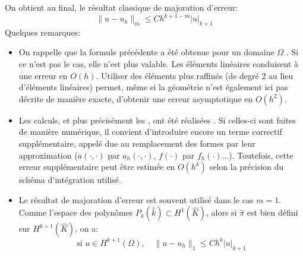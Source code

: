 On obtient au final, le résultat classique de majoration d'erreur:
\begin{equation}
\|u-u_h\|_m\le C h^{k+1-m} |u|_{k+1}
\end{equation}
Quelques remarques:
\begin{itemize}
  \item On rappelle que la formule précédente a été obtenue pour un domaine $\Omega$  . Si ce n'est pas le cas, elle n'est plus valable.
	Les éléments linéaires conduisent à une erreur en $O(h)$.
	Utiliser des éléments plus raffinés (de degré 2 au lieu d'éléments linéaires) permet, 	même si la géométrie n'est également ici pas décrite de manière exacte, d'obtenir une 	erreur asymptotique en $O(h^2)$.
  \item Les calculs, et plus précisément les , ont été réalisées .
	Si celles-ci sont faites de manière numérique, il convient d'introduire encore un 	terme correctif supplémentaire, appelé  due au remplacement des formes par leur approximation ($a(\cdot,\cdot)$ par $a_h(\cdot,\cdot)$, $f(\cdot)$ par $f_h(\cdot)$...). Toutefois, cette erreur supplémentaire peut être estimée en $O(h^k)$ selon la précision du schéma d'intégration utilisé.
  \item Le résultat de majoration d'erreur est souvent utilisé dans le cas $m=1$.
	Comme l'espace des polynômes $P_k(\hat{k})\subset H^1(\hat{K})$, alors si $\hat{\pi}$ est bien défini sur $H^{k+1}(\hat{K})$, on a:
	\begin{equation}
	\text{si } u\in H^{k+1}(\Omega), \quad \|u-u_h\|_1\le C h^k |u|_{k+1}
	\end{equation}
\end{itemize}
